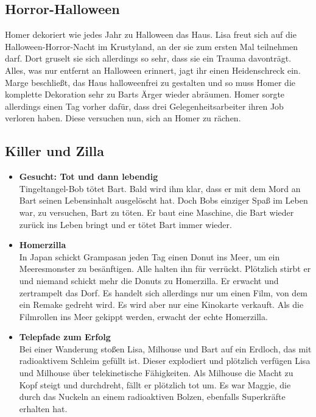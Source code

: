 
\subsection{Horror-Halloween}
Homer dekoriert wie jedes Jahr zu Halloween das Haus. Lisa freut sich auf die Halloween-Horror-Nacht im Krustyland, an der sie zum ersten Mal teilnehmen darf. Dort gruselt sie sich allerdings so sehr, dass sie ein Trauma davonträgt. Alles, was nur entfernt an Halloween erinnert, jagt ihr einen Heidenschreck ein. Marge beschließt, das Haus halloweenfrei zu gestalten und so muss Homer die komplette Dekoration sehr zu Barts Ärger wieder abräumen. Homer sorgte allerdings einen Tag vorher dafür, dass drei Gelegenheitsarbeiter ihren Job verloren haben. Diese versuchen nun, sich an Homer zu rächen.


\subsection{Killer und Zilla}
\begin{itemize}
	\item \textbf{Gesucht: Tot und dann lebendig}\\ Tingeltangel-Bob tötet Bart. Bald wird ihm klar, dass er mit dem Mord an Bart seinen Lebensinhalt ausgelöscht hat. Doch Bobs einziger Spaß im Leben war, zu versuchen, Bart zu töten. Er baut eine Maschine, die Bart wieder zurück ins Leben bringt und er tötet Bart immer wieder.
	\item \textbf{Homerzilla}\\ In Japan schickt Grampasan jeden Tag einen Donut ins Meer, um ein Meeresmonster zu besänftigen. Alle halten ihn für verrückt. Plötzlich stirbt er und niemand schickt mehr die Donuts zu Homerzilla. Er erwacht und zertrampelt das Dorf. Es handelt sich allerdings nur um einen Film, von dem ein Remake gedreht wird. Es wird aber nur eine Kinokarte verkauft. Als die Filmrollen ins Meer gekippt werden, erwacht der echte Homerzilla.
	\item \textbf{Telepfade zum Erfolg}\\ Bei einer Wanderung stoßen Lisa, Milhouse und Bart auf ein Erdloch, das mit radioaktivem Schleim gefüllt ist. Dieser explodiert und plötzlich verfügen Lisa und Milhouse über telekinetische Fähigkeiten. Als Milhouse die Macht zu Kopf steigt und durchdreht, fällt er plötzlich tot um. Es war Maggie, die durch das Nuckeln an einem radioaktiven Bolzen, ebenfalls Superkräfte erhalten hat.
\end{itemize}


